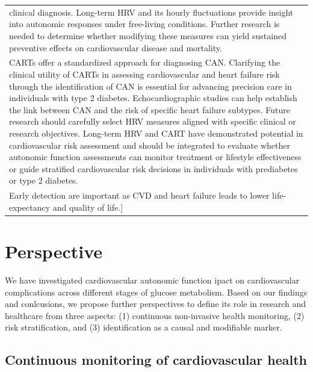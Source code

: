 \documentclass[
  a4paper,
  headsepline=true,
  open=any]{scrbook}
\begin{document}
\begin{longtable}[]{@{}
  >{\raggedright\arraybackslash}p{}@{}}
clinical diagnosis. Long-term HRV and its hourly fluctuations provide
insight into autonomic responses under free-living conditions. Further
research is needed to determine whether modifying these measures can
yield sustained preventive effects on cardiovascular disease and
mortality. \\
CARTs offer a standardized approach for diagnosing CAN. Clarifying the
clinical utility of CARTs in assessing cardiovascular and heart failure
risk through the identification of CAN is essential for advancing
precision care in individuals with type 2 diabetes. Echocardiographic
studies can help establish the link between CAN and the risk of specific
heart failure subtypes. Future research should carefully select HRV
measures aligned with specific clinical or research objectives.
Long-term HRV and CART have demonstrated potential in cardiovascular
risk assessment and should be integrated to evaluate whether autonomic
function assessments can monitor treatment or lifestyle effectiveness or
guide stratified cardiovascular risk decisions in individuals with
prediabetes or type 2 diabetes. \\
{[}Early detection are important as CVD and heart failure leads to lower
life-expectancy and quality of life.{]} \\
\end{longtable}


\hypertarget{perspective}{%
\chapter{Perspective}\label{perspective}}

We have investigated cardiovascular autonomic function ipact on
cardiovascular complications across different stages of glucose
metabolism. Based on our findings and conlcusions, we propose further
perspectives to define its role in research and healthcare from three
aspects: (1) continuous non-invasive health monitoring, (2) risk
stratification, and (3) identification as a causal and modifiable
marker.

\hypertarget{continuous-monitoring-of-cardiovascular-health}{%
\section{Continuous monitoring of cardiovascular
health}\label{continuous-monitoring-of-cardiovascular-health}}
\end{document}
